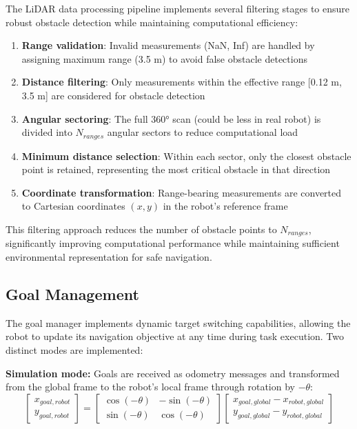 The LiDAR data processing pipeline implements several filtering stages to ensure robust obstacle detection while maintaining computational efficiency:

\begin{enumerate}
    \item \textbf{Range validation}: Invalid measurements (NaN, Inf) are handled by assigning maximum range (3.5 m) to avoid false obstacle detections
    \item \textbf{Distance filtering}: Only measurements within the effective range [0.12 m, 3.5 m] are considered for obstacle detection
    \item \textbf{Angular sectoring}: The full 360° scan (could be less in real robot) is divided into $N_{ranges}$ angular sectors to reduce computational load
    \item \textbf{Minimum distance selection}: Within each sector, only the closest obstacle point is retained, representing the most critical obstacle in that direction
    \item \textbf{Coordinate transformation}: Range-bearing measurements are converted to Cartesian coordinates $(x, y)$ in the robot's reference frame
\end{enumerate}

This filtering approach reduces the number of obstacle points to $N_{ranges}$, significantly improving computational performance while maintaining sufficient environmental representation for safe navigation.

\subsection{Goal Management}

The goal manager implements dynamic target switching capabilities, allowing the robot to update its navigation objective at any time during task execution. Two distinct modes are implemented:

\textbf{Simulation mode:} Goals are received as odometry messages and transformed from the global frame to the robot's local frame through rotation by $-\theta$:
\begin{equation}
    \begin{bmatrix} x_{goal,robot} \\ y_{goal,robot} \end{bmatrix} = 
    \begin{bmatrix} \cos(-\theta) & -\sin(-\theta) \\ \sin(-\theta) & \cos(-\theta) \end{bmatrix}
    \begin{bmatrix} x_{goal,global} - x_{robot,global} \\ y_{goal,global} - y_{robot,global} \end{bmatrix}
\end{equation}


